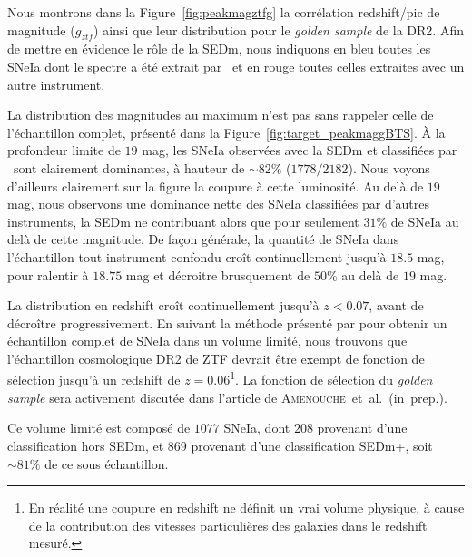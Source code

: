 \documentclass[../main/main.tex]{subfiles}
\begin{document}
Nous montrons dans la Figure~\ref{fig:peakmagztfg} la corrélation
redshift/pic de magnitude ($g_{ztf}$) ainsi que leur distribution pour
le \textit{golden sample} de la DR2.
Afin de mettre en évidence le rôle de la SEDm, nous indiquons en bleu toutes les SNeIa dont le spectre a été extrait par
\hypergal\ et en rouge toutes celles extraites avec un autre instrument.

La distribution des magnitudes au maximum n'est pas sans rappeler celle
de l'échantillon complet, présenté dans la Figure~\ref{fig:target_peakmaggBTS}.
À la profondeur limite de $19$ mag, les SNeIa observées avec la SEDm et
classifiées par \hypergal\
sont clairement dominantes, à hauteur de $\sim82\%$ ($1778/2182$). Nous
voyons d'ailleurs clairement sur la figure
la coupure à cette luminosité. Au delà de $19$ mag, nous observons une dominance nette des
SNeIa classifiées par d'autres instruments, la SEDm ne contribuant alors que
pour seulement $31\%$ de SNeIa au delà de cette magnitude. De façon
générale, la quantité de SNeIa dans l'échantillon
tout instrument confondu croît 
continuellement jusqu'à $18.5$ mag, pour
ralentir à $18.75$ mag et décroitre brusquement de $50\%$ au delà de $19$
mag.

La distribution en redshift croît continuellement jusqu'à $z<0.07$,
avant de décroître progressivement. En suivant la méthode présenté par
\citet{NoraNicolas21} pour obtenir un échantillon complet de SNeIa dans un
volume limité, nous trouvons que l'échantillon cosmologique
DR2 de ZTF devrait être exempt de fonction de sélection jusqu'à un
redshift de $z=0.06$\footnote{En réalité une coupure en redshift ne
  définit un vrai volume physique, à cause de la contribution des
  vitesses particulières des galaxies dans le redshift mesuré.}. La fonction de sélection du \textit{golden sample}
sera activement discutée dans
l'article de \mbox{\textsc{Amenouche} et al. (in prep.)}.

Ce volume limité est composé de $1077$ SNeIa, dont $208$ provenant d'une
classification hors SEDm, et $869$ provenant d'une
classification SEDm+\hypergal, soit $\sim81\%$ de ce sous échantillon.
\end{document}
